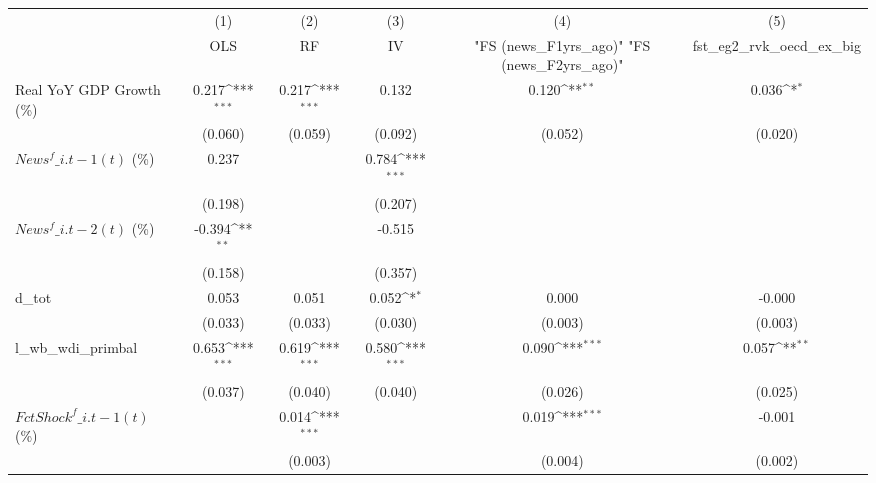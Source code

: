 {
\def\sym#1{\ifmmode^{#1}\else\(^{#1}\)\fi}
\begin{tabular}{l*{5}{c}}
\toprule
                    &\multicolumn{1}{c}{(1)}&\multicolumn{1}{c}{(2)}&\multicolumn{1}{c}{(3)}&\multicolumn{1}{c}{(4)}&\multicolumn{1}{c}{(5)}\\
                    &\multicolumn{1}{c}{OLS}&\multicolumn{1}{c}{RF}&\multicolumn{1}{c}{IV}&\multicolumn{1}{c}{ "FS (news\_F1yrs\_ago)"  "FS (news\_F2yrs\_ago)" }&\multicolumn{1}{c}{fst\_eg2\_rvk\_oecd\_ex\_big}\\
\midrule
Real YoY GDP Growth (\%)&       0.217\sym{***}&       0.217\sym{***}&       0.132         &       0.120\sym{**} &       0.036\sym{*}  \\
                    &     (0.060)         &     (0.059)         &     (0.092)         &     (0.052)         &     (0.020)         \\
\addlinespace
$ News^f\_{i.t-1}(t)$ (\%)&       0.237         &                     &       0.784\sym{***}&                     &                     \\
                    &     (0.198)         &                     &     (0.207)         &                     &                     \\
\addlinespace
$ News^f\_{i.t-2}(t)$ (\%)&      -0.394\sym{**} &                     &      -0.515         &                     &                     \\
                    &     (0.158)         &                     &     (0.357)         &                     &                     \\
\addlinespace
d\_tot               &       0.053         &       0.051         &       0.052\sym{*}  &       0.000         &      -0.000         \\
                    &     (0.033)         &     (0.033)         &     (0.030)         &     (0.003)         &     (0.003)         \\
\addlinespace
l\_wb\_wdi\_primbal    &       0.653\sym{***}&       0.619\sym{***}&       0.580\sym{***}&       0.090\sym{***}&       0.057\sym{**} \\
                    &     (0.037)         &     (0.040)         &     (0.040)         &     (0.026)         &     (0.025)         \\
\addlinespace
$ FctShock^f\_{i.t-1}(t)$ (\%)&                     &       0.014\sym{***}&                     &       0.019\sym{***}&      -0.001         \\
                    &                     &     (0.003)         &                     &     (0.004)         &     (0.002)         \\

\end{tabular}}
